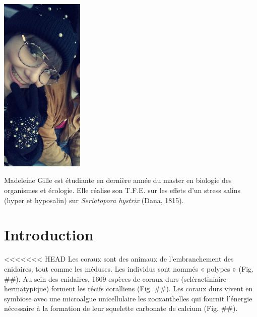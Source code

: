 \documentclass[]{report}
\begin{document}
\includegraphics[width=4.00000cm]{../image/madeleine.jpg}

Madeleine Gille est étudiante en dernière année du master en biologie
des organismes et écologie. Elle réalise son T.F.E. sur les effets d'un
stress salins (hyper et hyposalin) sur \emph{Seriatopora hystrix} (Dana,
1815).

\chapter{Introduction}\label{introduction}

<<<<<<< HEAD
Les coraux sont des animaux de l'embranchement des cnidaires, tout comme
les méduses. Les individus sont nommés « polypes » (Fig. \#\#). Au sein
des cnidaires, 1609 espèces de coraux durs (scléractiniaire
hermatypique) forment les récifs coralliens (Fig. \#\#). Les coraux durs
vivent en symbiose avec une microalgue unicellulaire les zooxanthelles
qui fournit l'énergie nécessaire à la formation de leur squelette
carbonate de calcium (Fig. \#\#).
\end{document}
